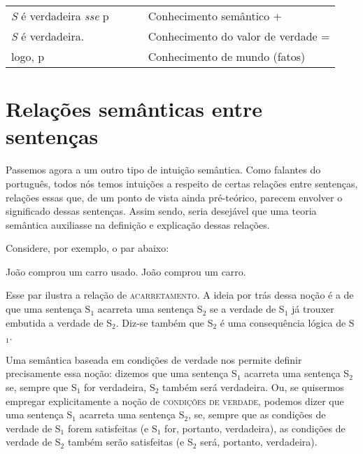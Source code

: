 \begin{exe}
	\ex \begin{tabular}[t]{l l l}

  \textit{S} é verdadeira \textit{sse} p & \ \ \  & Conhecimento semântico + \\
	\textit{S} é verdadeira. & \ \ \  & Conhecimento do valor de verdade = \\
  logo, p & \ \ \  & Conhecimento de mundo (fatos) \\

	\end{tabular}
\end{exe}



\section{Relações semânticas entre sentenças}

Passemos agora a um outro tipo de intuição semântica. Como falantes do português, todos nós temos intuições a respeito
de certas relações entre sentenças, relações essas que, de um ponto
de vista ainda pré-teórico, parecem envolver o significado dessas
sentenças. Assim sendo, seria desejável que uma teoria semântica
auxiliasse na definição e explicação dessas relações.

Considere, por exemplo, o par abaixo:


\begin{exe}
    \ex\label{ac}
    \begin{xlist}
        \ex  João comprou um carro usado.\label{aca}
        \ex  João comprou um carro.\label{acb}
    \end{xlist}
\end{exe}

\n Esse par ilustra a relação de \textsc{acarretamento}. A ideia
por trás dessa noção é a de que uma sentença S$_{1}$ acarreta uma
sentença S$_{2}$ se a verdade de S$_{1}$ já trouxer embutida a verdade
de S$_{2}$. Diz-se também que S$_{2}$ é uma consequência lógica de
S$_{1}$.

Uma semântica baseada em condições de verdade nos permite definir
precisamente essa noção: dizemos que uma sentença S$_{1}$ acarreta
uma sentença S$_{2}$ se, sempre que S$_{1}$ for verdadeira, S$_{2}$
também será verdadeira. Ou, se quisermos empregar explicitamente a
no\-ção de \textsc{condi\-çõ\-es de verdade}, podemos dizer que
uma sentença S$_{1}$ acarreta uma sentença S$_{2}$, se, sempre que as
condi\-çõ\-es de verdade de S$_{1}$ forem satisfeitas (e S$_{1}$ for,
portanto, verdadeira), as condi\-çõ\-es de verdade de S$_{2}$ também
serão satisfeitas (e S$_{2}$ será, portanto, verdadeira).


